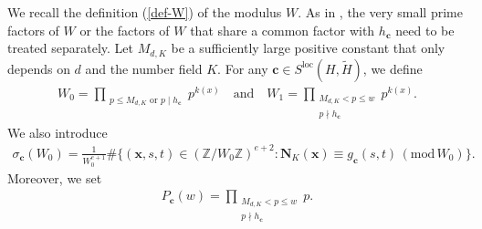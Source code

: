 \documentclass[reqno, 11pt]{amsart}
\renewcommand{\leq}{\leqslant}
\theoremstyle{definition}
\theoremstyle{definition}
\renewcommand{\leq}{\leqslant}
\renewcommand{\mod}{\mathrm{mod}\,}
\newcommand{\cc}{\mathbf{c}}
\newcommand{\xx}{\mathbf{x}}
\newcommand{\ZZ}{\mathbb{Z}}
\newcommand{\NNN}{\mathbf{N}}
\numberwithin{equation}{section}
\begin{document}
We recall the definition (\ref{def-W}) of the modulus $W$. As in \cite[Section 9]{BST}, the very small prime factors of $W$ or the factors of $W$ that share a common factor with $h_\cc$ need to be treated separately.
Let $M_{d, K}$ be a sufficiently large positive constant that only depends on $d$ and the number field $K$. For any $\cc \in S^{\mathrm{loc}}(H, \tilde{H})$, we define
\begin{align}\label{def-W0}
	W_0 = \prod_{\substack{p \leq M_{d,K} \text{ or } p \mid h_\cc}} p^{k(x)}
\quad \text{and} \quad
W_1 = \prod_{\substack{M_{d,K} < p \leq w \\ p \nmid h_\cc}} p^{k(x)}.
\end{align}
We also introduce 
\begin{align}\label{def-sigma}
	\sigma_\cc(W_0) = \frac{1}{W_0^{e+1}} \#\{(\xx, s, t) \in (\ZZ / W_0 \ZZ)^{e+2}: \NNN_K(\xx) \equiv g_\cc(s,t) \, (\mod W_0)\}.
\end{align}
Moreover, we set
\begin{align}\label{def-Pc}
	P_\cc(w) = \prod_{\substack{M_{d, K} < p \leq w \\ p \nmid h_\cc}} p.
\end{align}
\end{document}
